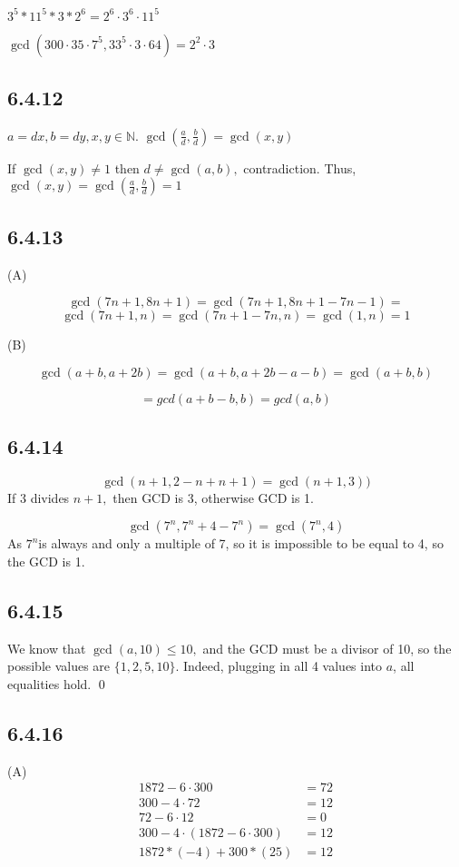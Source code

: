 \documentclass{article}
\begin{document}
$3^5*11^5*3*2^6=2^6\cdot3^6\cdot11^5$

$\gcd(300\cdot35\cdot7^5,33^5\cdot3\cdot64)=2^2\cdot3$

\subsection*{6.4.12}

$a=dx,b=dy,x,y\in\mathbb{N}.$ $\gcd(\frac{a}d,\frac{b}d)=\gcd(x,y)$

If $\gcd(x,y)\neq1$ then $d\neq\gcd(a,b),$ contradiction. Thus, $\gcd(x,y)=\gcd(\frac{a}d,\frac{b}d)=1$ 

\subsection*{6.4.13}

(A)

$$\gcd(7n+1,8n+1)=\gcd(7n+1,8n+1-7n-1)=$$$$\gcd(7n+1,n)=\gcd(7n+1-7n,n)=\gcd(1,n)=1$$

(B)

$$\gcd(a+b,a+2b)=\gcd(a+b,a+2b-a-b)=\gcd(a+b,b)$$

$$=gcd(a+b-b,b)=gcd(a,b)$$

\subsection*{6.4.14}

$$\gcd(n+1,2-n+n+1)=\gcd(n+1,3))$$ If 3 divides $n+1,$ then GCD is 3, otherwise GCD is 1.

$$\gcd(7^n,7^n+4-7^n)=\gcd(7^n,4)$$
As $7^n$is always and only a multiple of 7, so it is impossible to be equal to 4, so the GCD is 1. 

\subsection*{6.4.15}

We know that $\gcd(a,10)\leq10,$ and the GCD must be a divisor of 10, so the possible values are $\{1,2,5,10\}.$ Indeed, plugging in all 4 values into $a$, all equalities hold. \qed

\subsection*{6.4.16}

(A)\begin{align*}
    1872-6\cdot300&=72\\
    300-4\cdot72&=12\\
    72-6\cdot12&=0\\
    300-4\cdot(1872-6\cdot300)&=12\\
    1872*(-4)+300*(25)&=12
\end{align*}
\end{document}
